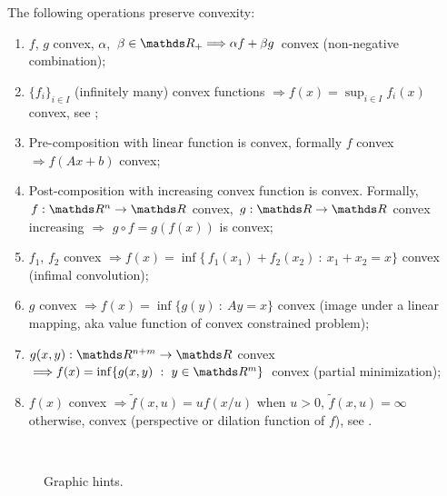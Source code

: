 \documentclass[computationalMathematics.tex]{subfiles}
\begin{document}
\begin{proposition}
The following operations preserve convexity:

\begin{enumerate}
 \item $f$, $g$ convex, $\alpha$, $\beta \in \R_+ \Longrightarrow \alpha f + \beta g$ convex (non-negative combination);
 \item ${\{f_i\}}_{i \in I}$ (infinitely many) convex functions $\Longrightarrow f(x) = \sup_{i \in I} f_i(x)$ convex, see ;
 \item Pre-composition with linear function is convex, formally $f$ convex $\Longrightarrow f(Ax + b)$ convex;
 \item Post-composition with increasing convex function is convex. Formally, $f : \R^n \to \R$ convex, $g : \R \to \R$ convex increasing $\Longrightarrow$ $g \circ f = g(f(x))$ is convex;
 \item $f_1$, $f_2$ convex $\Longrightarrow f(x) = \inf \{ \, f_1(x_1) + f_2(x_2)~:~x_1 + x_2 = x\}$ convex (infimal convolution);
 \item $g$ convex $\Longrightarrow f(x) = \inf \{g(y)~:~Ay = x\}$ convex (image under a linear mapping, aka value function of convex constrained problem);
 \item $g(x,y) : \R^{n + m} \to \R$ convex $\Longrightarrow f(x) = \inf \{g(x,y)~:~y \in \R^m\}$ convex (partial minimization);
 \item $f(x)$ convex $\Longrightarrow \tilde{f}(x,u) = u f(x / u)$ when $u > 0$, $\tilde{f}(x,u) = \infty$ otherwise, convex (perspective or dilation function of $f$), see .
\end{enumerate}
\end{proposition}

\begin{figure}[h]
  \centering
  \hspace{0.5cm}
  \\
  \caption{Graphic hints.}\label{fig:11ott_1}
\end{figure}
\end{document}

